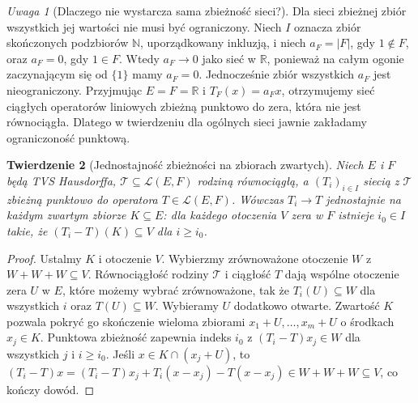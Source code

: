 \documentclass[11pt,a4paper]{article}
\numberwithin{equation}{section}
\theoremstyle{plain}
\newtheorem{twierdzenie}{Twierdzenie}[section]
\theoremstyle{definition}
\theoremstyle{remark}
\newtheorem{uwaga}[twierdzenie]{Uwaga}
\newcommand{\R}{\mathbb R}
\newcommand{\N}{\mathbb N}
\begin{document}
\begin{uwaga}[Dlaczego nie wystarcza sama zbieżność sieci?]
Dla sieci zbieżnej zbiór wszystkich jej wartości nie musi
być ograniczony. Niech $I$ oznacza zbiór skończonych
podzbiorów $\N$, uporządkowany inkluzją, i niech
$a_F=|F|$, gdy $1\notin F$, oraz $a_F=0$, gdy $1\in F$.
Wtedy $a_F\to0$ jako sieć w $\R$, ponieważ na całym
ogonie zaczynającym się od $\{1\}$ mamy $a_F=0$.
Jednocześnie zbiór wszystkich $a_F$ jest nieograniczony.
Przyjmując $E=F=\R$ i $T_F(x)=a_Fx$, otrzymujemy sieć
ciągłych operatorów liniowych zbieżną punktowo do zera,
która nie jest równociągła. Dlatego w twierdzeniu dla
ogólnych sieci jawnie zakładamy ograniczoność punktową.
\end{uwaga}

\begin{twierdzenie}[Jednostajność zbieżności na zbiorach zwartych]
\label{thm:equicont-compact-conv}
Niech $E$ i $F$ będą TVS Hausdorffa,
$\mathcal T\subseteq\mathcal L(E,F)$ rodziną równociągłą,
a $(T_i)_{i\in I}$ siecią z $\mathcal T$ zbieżną punktowo
do operatora $T\in\mathcal L(E,F)$.
Wówczas $T_i\to T$ jednostajnie na każdym zwartym
zbiorze $K\subseteq E$: dla każdego otoczenia $V$ zera
w $F$ istnieje $i_0\in I$ takie, że
$(T_i-T)(K)\subseteq V$ dla $i\ge i_0$.
\end{twierdzenie}
\begin{proof}
Ustalmy $K$ i otoczenie $V$. Wybierzmy zrównoważone
otoczenie $W$ z $W+W+W\subseteq V$. Równociągłość
rodziny $\mathcal T$ i ciągłość $T$ dają wspólne
otoczenie zera $U$ w $E$, które możemy wybrać
zrównoważone, tak że $T_i(U)\subseteq W$ dla wszystkich
$i$ oraz $T(U)\subseteq W$.
Wybieramy $U$ dodatkowo otwarte. Zwartość $K$
pozwala pokryć go skończenie wieloma zbiorami
$x_1+U,\ldots,x_m+U$ o środkach $x_j\in K$.
Punktowa zbieżność zapewnia indeks $i_0$ z
$(T_i-T)x_j\in W$ dla wszystkich $j$ i $i\ge i_0$.
Jeśli $x\in K\cap(x_j+U)$, to
$(T_i-T)x=(T_i-T)x_j+T_i(x-x_j)-T(x-x_j)\in W+W+W
\subseteq V$, co kończy dowód.
\end{proof}
\end{document}
